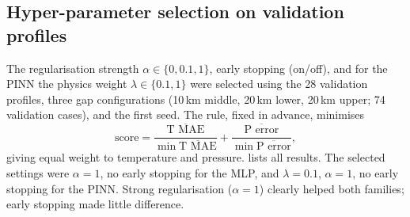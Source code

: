 \documentclass[11pt,a4paper]{article}
\begin{document}
\subsection{Hyper-parameter selection on validation profiles}\label{sec:hp}
The regularisation strength $\alpha\in\{0,0.1,1\}$, early stopping (on/off), and for the PINN the physics weight $\lambda\in\{0.1,1\}$ were selected using the 28 validation profiles, three gap configurations (10\,km middle, 20\,km lower, 20\,km upper; 74 validation cases), and the first seed. The rule, fixed in advance, minimises
\begin{equation}
\text{score} = \frac{\overline{\text{T MAE}}}{\min\overline{\text{T MAE}}} + \frac{\overline{\text{P error}}}{\min\overline{\text{P error}}},
\end{equation}
giving equal weight to temperature and pressure.  lists all results. The selected settings were $\alpha=1$, no early stopping for the MLP, and $\lambda=0.1$, $\alpha=1$, no early stopping for the PINN. Strong regularisation ($\alpha=1$) clearly helped both families; early stopping made little difference.
\end{document}

